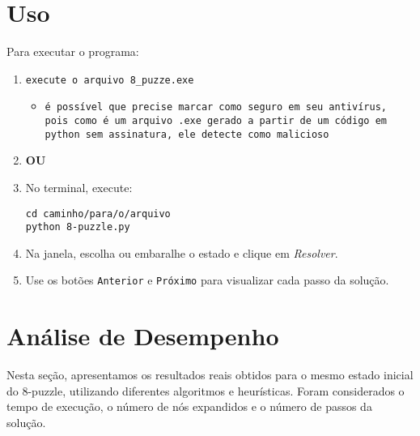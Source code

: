 \documentclass[12pt]{article}
\begin{document}
\section{Uso}
Para executar o programa:
\begin{enumerate}
  \item \texttt{execute o arquivo 8\_puzze.exe}
  	\begin{itemize}
        	\item \texttt{é possível que precise marcar como seguro em seu antivírus, pois como é um arquivo .exe gerado a partir de um código em python sem assinatura, ele detecte como malicioso}
    \end{itemize}
  \item \textbf{OU}
  \item No terminal, execute:
  \begin{verbatim}
cd caminho/para/o/arquivo
python 8-puzzle.py
  \end{verbatim}
  \item Na janela, escolha ou embaralhe o estado e clique em \textit{Resolver}.
  \item Use os botões \texttt{Anterior} e \texttt{Próximo} para visualizar cada passo da solução.
\end{enumerate}

\section{Análise de Desempenho}

Nesta seção, apresentamos os resultados reais obtidos para o mesmo estado inicial do 8-puzzle, utilizando diferentes algoritmos e heurísticas. Foram considerados o tempo de execução, o número de nós expandidos e o número de passos da solução.
\end{document}
